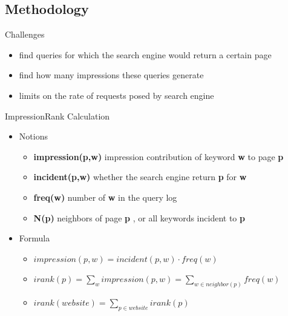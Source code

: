\documentclass{beamer}
\newcommand{\page}{\textbf{p} }
\newcommand{\keyword}{\textbf{w} }
\begin{document}
    \subsection{Methodology}

    \begin{frame}{Challenges}
        \begin{itemize}
        \item find queries for which the search engine would return a certain page
        \item find how many impressions these queries generate
        \item limits on the rate of requests posed by search engine
        \end{itemize}
    \end{frame}

    \begin{frame}{ImpressionRank Calculation}
        \begin{itemize}
        \item Notions
            \begin{itemize}
            \item \textbf{impression(p,w)} impression contribution of keyword \keyword to page \page
            \item \textbf{incident(p,w)} whether the search engine return \page for \keyword
            \item \textbf{freq(w)} number of \keyword in the query log
            \item \textbf{N(p)} neighbors of page \page, or all keywords incident to \page
            \end{itemize}
        \item Formula
            \begin{itemize}
            \item $ impression(p, w) = incident(p, w) \cdot freq(w) $
            \item $ irank(p) = \sum_{w}impression(p,w) = \sum_{w\in neighbor(p)}freq(w) $
            \item $ irank(website) = \sum_{p\in website}irank(p) $
            \end{itemize}
        \end{itemize}
    \end{frame}
\end{document}
